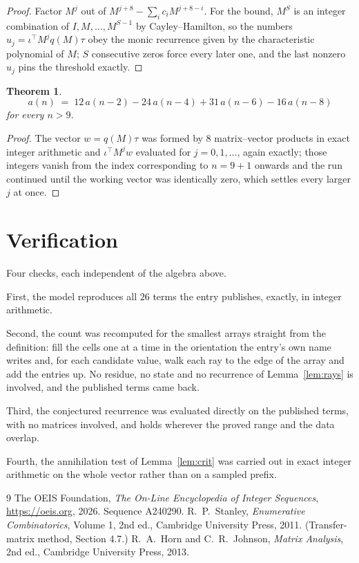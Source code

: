 \documentclass[11pt,a4paper]{article}
\theoremstyle{plain}
\newtheorem{theorem}{Theorem}
\theoremstyle{definition}
\begin{document}
\begin{proof}
Factor $M^{j}$ out of $M^{j+8}-\sum_ic_iM^{j+8-i}$. For the bound, $M^{S}$
is an integer combination of $I,M,\dots,M^{S-1}$ by Cayley--Hamilton, so the numbers
$u_j=\iota^{\!\top}M^{j}q(M)\tau$ obey the monic recurrence given by the characteristic
polynomial of $M$; $S$ consecutive zeros force every later one, and the last nonzero $u_j$
pins the threshold exactly.
\end{proof}

\begin{theorem}
\[
a(n)\;=\;12\,a(n-2) - 24\,a(n-4) + 31\,a(n-6) - 16\,a(n-8)
\]
for every $n>9$.
\end{theorem}

\begin{proof}
The vector $w=q(M)\tau$ was formed by $8$ matrix--vector products in exact integer
arithmetic and $\iota^{\!\top}M^{j}w$ evaluated for $j=0,1,\dots$, again exactly; those
integers vanish from the index corresponding to $n=9+1$ onwards and the run continued
until the working vector was identically zero, which settles every larger $j$ at once.
\end{proof}

\section{Verification}

Four checks, each independent of the algebra above.

First, the model reproduces all $26$ terms the entry publishes, exactly, in integer
arithmetic.

Second, the count was recomputed for the smallest arrays straight from the definition: fill the
cells one at a time in the orientation the entry's own name writes and, for each candidate
value, walk each ray to the edge of the array and add the entries up. No residue, no state and
no recurrence of Lemma~\ref{lem:rays} is involved, and the published terms came back.

Third, the conjectured recurrence was evaluated directly on the published terms, with no
matrices involved, and holds wherever the proved range and the data overlap.

Fourth, the annihilation test of Lemma~\ref{lem:crit} was carried out in exact integer
arithmetic on the whole vector rather than on a sampled prefix.

\begin{thebibliography}{9}
 The OEIS Foundation, \emph{The On-Line Encyclopedia of Integer
Sequences}, \url{https://oeis.org}, 2026. Sequence A240290.
 R.~P.~Stanley, \emph{Enumerative Combinatorics}, Volume 1, 2nd ed.,
Cambridge University Press, 2011. (Transfer-matrix method, Section 4.7.)
 R.~A.~Horn and C.~R.~Johnson, \emph{Matrix Analysis}, 2nd ed., Cambridge
University Press, 2013.
\end{thebibliography}
\end{document}
